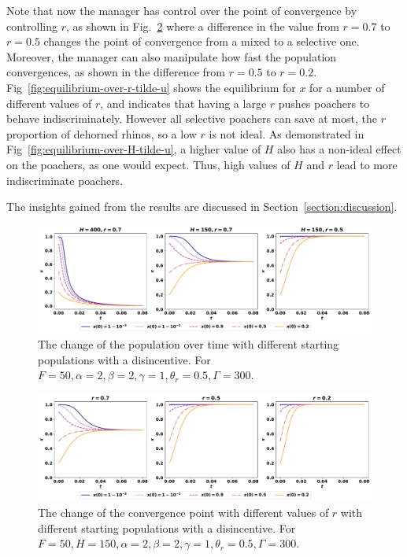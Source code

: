 \documentclass[10pt]{article}
\begin{document}
Note that now the manager has control over the point of convergence by
controlling \(r\), as shown in Fig.~\ref{fig:convergence-over-r}
where
a difference in the value from \(r=0.7\) to \(r=0.5\) changes the point of
convergence from a mixed to a selective one. Moreover, the manager can also
manipulate how fast the population convergences, as shown in the difference from
\(r=0.5\) to \(r=0.2\). Fig~\ref{fig:equilibrium-over-r-tilde-u} shows the
equilibrium for \(x\) for a number of different values of \(r\), and indicates
that having a large \(r\) pushes poachers to behave indiscriminately. However all
selective poachers can save at most, the $r$ proportion of dehorned rhinos, so a
low \(r\) is not ideal. As demonstrated in Fig~\ref{fig:equilibrium-over-H-tilde-u},
a higher value of \(H\) also has a non-ideal effect on the poachers, as one would
expect. Thus, high values of \(H\) and \(r\) lead to more indiscriminate poachers.

\noindent The insights gained from the results are discussed in Section~\ref{section:discussion}.

\begin{figure}[!htbp]
    \includegraphics[width=\textwidth]{images/ESS-new-utility.pdf}
    \caption{The change of the population over
    time with different starting populations with a disincentive. For \(F=50, \alpha=2,
    \beta=2, \gamma=1, \theta_r=0.5, \Gamma=300\).}
    \label{fig:ess-new-utility}
\end{figure}

\begin{figure}[!htbp]
    \includegraphics[width=\textwidth]{images/ESS-new-utility-based-r.pdf}
    \caption{The change of the convergence point with different values of \(r\)
    with different starting populations with a disincentive. For \(F=50, H=150,
    \alpha=2, \beta=2, \gamma=1, \theta_r=0.5, \Gamma=300\).}
    \label{fig:convergence-over-r}
\end{figure}
\end{document}
